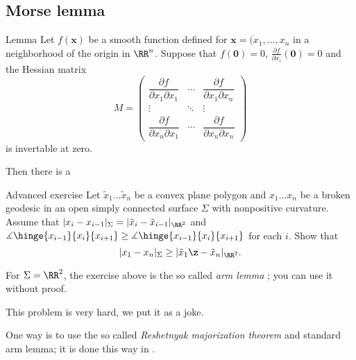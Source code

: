 \subsection*{Morse lemma}

\begin{thm}{Lemma}\label{lem:morse}
Let $f(\bm{x})$ be a smooth function defined for $\bm{x}=(x_1,\dots,x_n$ in a neighborhood of the origin in $\RR^n$.
Suppose that $f(\bm{0})=0$, $\tfrac{\partial f}{\partial x_i}(\bm{0})=0$ and the Hessian matrix
\[M=\begin{pmatrix}
\dfrac{\partial f}{\partial x_1\partial x_1} & \cdots & \dfrac{\partial f}{\partial x_1\partial x_n}\\
\vdots & \ddots & \vdots\\
\dfrac{\partial f}{\partial x_n\partial x_1} & \cdots & \dfrac{\partial f}{\partial x_n\partial x_n} \end{pmatrix}\]
is invertable at zero.

Then there is a 
\end{thm}
















\begin{thm}{Advanced exercise}\label{ex:arm-lemma}
Let $\tilde x_1\dots\tilde x_n$ be a convex plane polygon and
$x_1\dots x_n$ be a broken geodesic in an open simply connected surface $\Sigma$ with nonpositive curvature.
Assume that
$|x_i-x_{i-1}|_\Sigma=|\tilde x_i-\tilde x_{i-1}|_{\RR^2}$ and
$\measuredangle\hinge{x_{i-1}}{x_i}{x_{i+1}}\ge \measuredangle\hinge{x_{i-1}}{x_i}{x_{i+1}}$
 for each $i$.
Show that \[|x_1-x_n|_\Sigma\ge |\tilde x_1\z-\tilde x_n|_{\RR^2}.\]
\end{thm}

For $\Sigma=\RR^2$, the exercise above is the so called \emph{arm lemma} \cite{sabitov}; 
you can use it without proof.

This problem is very hard, we put it as a joke.

One way is to use the so called \emph{Reshetnyak majorization theorem} and standard arm lemma; it is done this way in \cite{alexander-kapovitch-petrunin2027}.






















